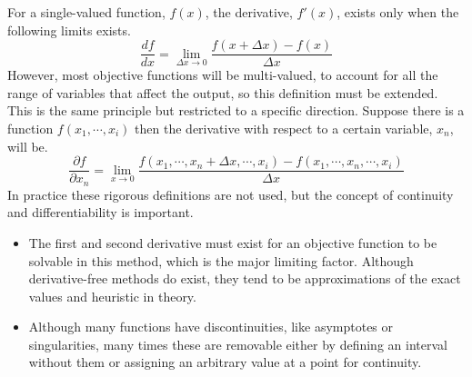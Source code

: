 \documentclass[10pt,a4paper]{report}
\begin{document}
				For a single-valued function, $f(x)$, the derivative, $f'(x)$, exists only when the following limits exists.
				\begin{equation}
					\frac{df}{dx} = \lim_{\Delta x \to 0} \frac{f(x+\Delta x) - f(x)}{\Delta x}
					\label{eq:first-principles-uni}
				\end{equation}
				However, most objective functions will be multi-valued, to account for all the range of variables that affect the output, so this
				definition must be extended. This is the same principle but restricted to a specific direction. Suppose
				there is a function $f(x_1,\cdots,x_i)$ then the derivative with respect to a certain variable, $x_n$, will be.
				\begin{equation}
					\frac{\partial f}{\partial x_n} = \lim_{x \to 0} \frac{f(x_1,\cdots,x_n+\Delta x,\cdots,x_i) - f(x_1, \cdots,x_n,\cdots,x_i)}{\Delta x}
					\label{eq:first-principles-multi}
				\end{equation}
				In practice these rigorous definitions are not used, but the concept of continuity and differentiability is important.
				\begin{itemize}
					\item The first and second derivative must exist for an objective function to be solvable in this method,
					which is the major limiting factor. Although derivative-free methods do exist,
					they tend to be approximations of the exact values and heuristic in theory.
					\item Although many functions have discontinuities, like asymptotes or singularities, many times these are
					removable either by defining an interval without them or assigning an arbitrary value at a point for continuity.
				\end{itemize}
\end{document}
